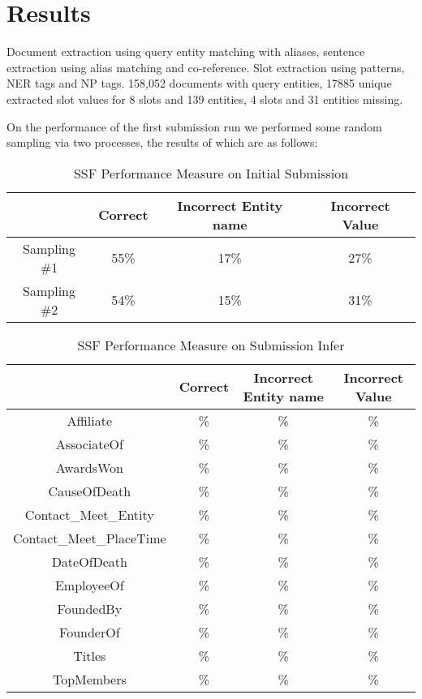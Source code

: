 
\section{Results}

Document extraction using query entity matching with aliases, sentence extraction using alias matching and co-reference. Slot extraction using patterns, NER tags and NP tags. 158,052 documents with query entities, 17885 unique extracted slot values for 8 slots and 139 entities, 4 slots and 31 entities missing.

On the performance of the first submission run we performed some random sampling via two processes, the results of which are as follows:

\begin{table}[b]
\caption{SSF Performance Measure on Initial Submission }
\centering
\begin{tabular}{|c|c|c|c|}
\hline 
 & Correct & Incorrect Entity name & Incorrect Value \\ 
\hline 
Sampling \#1 & 55\% & 17\% & 27\% \\ 
\hline Sampling \#2 & 54\% & 15\% & 31\%  \\ 
\hline 
\end{tabular} 
\end{table}

\begin{table}[b]
\caption{SSF Performance Measure on Submission Infer }
\centering
\begin{tabular}{|c|c|c|c|}
\hline 
 & Correct & Incorrect Entity name & Incorrect Value \\ 
\hline 
Affiliate & \% & \% & \% \\ \hline 
AssociateOf & \% & \% & \%  \\ \hline 
AwardsWon & \% & \% & \%  \\ \hline 
CauseOfDeath & \% & \% & \%  \\ \hline 
Contact\_Meet\_Entity & \% & \% & \%  \\ \hline 
Contact\_Meet\_PlaceTime & \% & \% & \%  \\ \hline 
DateOfDeath & \% & \% & \%  \\ \hline 
EmployeeOf & \% & \% & \%  \\ \hline 
FoundedBy & \% & \% & \%  \\ \hline 
FounderOf & \% & \% & \%  \\ \hline 
Titles & \% & \% & \%  \\ \hline 
TopMembers & \% & \% & \%  \\ \hline 

\end{tabular} 
\end{table}


